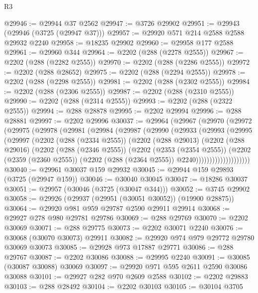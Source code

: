 \begin{lexlean}{R3}
\begin{coremodule}
@29946 := @29944 @37 @2562
@29947 := @3726 @29902
@29951 := @29943 (@29946 (@3725 (@29947 @37)))
@29957 := @29920 @571 @214 @2588 @2588 @29932 @2240
@29958 := @18235 @29902
@29960 := @29958 @177 @2588
@29961 := @29960 @344
@29964 := @2202 (@288 (@2278 @2555))
@29967 := @2202 (@288 (@2282 @2555))
@29970 := @2202 (@288 (@2286 @2555))
@29972 := @2202 (@288 @28652)
@29975 := @2202 (@288 (@2294 @2555))
@29978 := @2202 (@288 (@2298 @2555))
@29981 := @2202 (@288 (@2302 @2555))
@29984 := @2202 (@288 (@2306 @2555))
@29987 := @2202 (@288 (@2310 @2555))
@29990 := @2202 (@288 (@2314 @2555))
@29993 := @2202 (@288 (@2322 @2555))
@29994 := @288 @28878
@29995 := @2202 @29994
@29996 := @288 @28881
@29997 := @2202 @29996
@30037 := @29964
    (@29967
      (@29970
        (@29972
          (@29975
            (@29978
              (@29981
                (@29984
                  (@29987
                    (@29990
                      (@29933
                        (@29993
                          (@29995
                            (@29997
                              (@2202
                                (@288 (@2334 @2555))
                                (@2202
                                  (@288 @29013)
                                  (@2202
                                    (@288 @29016)
                                    (@2202
                                      (@288 (@2346 @2555))
                                      (@2202
                                        (@2353 (@2354 @2555))
                                        (@2202
                                          (@2359 (@2360 @2555))
                                          (@2202 (@288 (@2364 @2555)) @2240))))))))))))))))))))
@30040 := @29961 @30037 @159 @29932
@30045 := @29944 @159 @29893 (@3725 (@29947 @159))
@30046 := @30040 @30045
@30047 := @18286 @30037
@30051 := @29957 (@30046 (@3725 (@30047 @344)))
@30052 := @3745 @29902
@30058 := @29926 (@29937 (@29951 (@30051 @30052)) (@19900 @28875))
@30064 := @29920 @981 @959 @29787 @2590 @29911 @29914
@30068 := @29927 @278 @980 @29781 @29786
@30069 := @288 @29769
@30070 := @2202 @30069
@30071 := @288 @29775
@30073 := @2202 @30071 @2240
@30076 := @30068 (@30070 @30073) @29911
@30082 := @29920 @974 @979 @29772 @29780 @30069 @30073
@30085 := @29928 @973 @17887 @29771
@30086 := @288 @29767
@30087 := @2202 @30086
@30088 := @29995 @2240
@30091 := @30085 (@30087 @30088) @30069
@30097 := @29920 @971 @595 @2611 @2590 @30086 @30088
@30101 := @29927 @282 @970 @2609 @2588
@30102 := @2202 @29883
@30103 := @288 @28492
@30104 := @2202 @30103
@30105 := @30104 @3705

\end{coremodule}
\end{lexlean}
